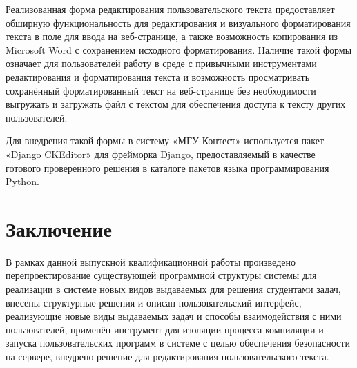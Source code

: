 \documentclass[a4paper]{article}
\begin{document}
Реализованная форма редактирования пользовательского текста предоставляет обширную функциональность для редактирования и визуального форматирования текста в поле для ввода на веб-странице, а также возможность копирования из Microsoft Word с сохранением исходного форматирования. Наличие такой формы означает для пользователей работу в среде с привычными инструментами редактирования и форматирования текста и возможность просматривать сохранённый форматированный текст на веб-странице без необходимости выгружать и загружать файл с текстом для обеспечения доступа к тексту других пользователей.

Для внедрения такой формы в систему «МГУ Контест» используется пакет «Django CKEditor» \cite{ckeditor} для фрейморка Django, предоставляемый в качестве готового проверенного решения в каталоге пакетов языка программирования Python.



\newpage
\section{Заключение}
В рамках данной выпускной квалификационной работы произведено перепроектирование существующей программной структуры системы для реализации в системе новых видов выдаваемых для решения студентами задач, внесены структурные решения и описан пользовательский интерфейс, реализующие новые виды выдаваемых задач и способы взаимодействия с ними пользователей, применён инструмент для изоляции процесса компиляции и запуска пользовательских программ в системе с целью обеспечения безопасности на сервере, внедрено решение для редактирования пользовательского текста.



\newpage
\end{document}
